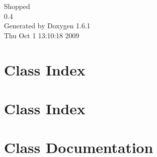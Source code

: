 \documentclass[a4paper]{book}
\begin{document}
\hypersetup{pageanchor=false}
\begin{titlepage}
\vspace*{7cm}
\begin{center}
{\Large Shopped \\[1ex]\large 0.4 }\\
\vspace*{1cm}
{\large Generated by Doxygen 1.6.1}\\
\vspace*{0.5cm}
{\small Thu Oct 1 13:10:18 2009}\\
\end{center}
\end{titlepage}
\clearemptydoublepage
{}
\tableofcontents
\clearemptydoublepage
{}
\hypersetup{pageanchor=true}
\chapter{Class Index}

\chapter{Class Index}

\chapter{Class Documentation}








\printindex
\end{document}
